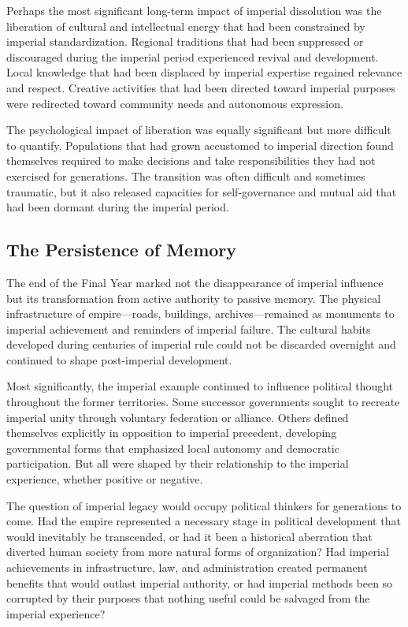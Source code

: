 Perhaps the most significant long-term impact of imperial dissolution
was the liberation of cultural and intellectual energy that had been
constrained by imperial standardization. Regional traditions that had
been suppressed or discouraged during the imperial period experienced
revival and development. Local knowledge that had been displaced by
imperial expertise regained relevance and respect. Creative activities
that had been directed toward imperial purposes were redirected toward
community needs and autonomous expression.

The psychological impact of liberation was equally significant but more
difficult to quantify. Populations that had grown accustomed to imperial
direction found themselves required to make decisions and take
responsibilities they had not exercised for generations. The transition
was often difficult and sometimes traumatic, but it also released
capacities for self-governance and mutual aid that had been dormant
during the imperial period.

\subsection{The Persistence of Memory}\label{the-persistence-of-memory}

The end of the Final Year marked not the disappearance of imperial
influence but its transformation from active authority to passive
memory. The physical infrastructure of empire---roads, buildings,
archives---remained as monuments to imperial achievement and reminders
of imperial failure. The cultural habits developed during centuries of
imperial rule could not be discarded overnight and continued to shape
post-imperial development.

Most significantly, the imperial example continued to influence
political thought throughout the former territories. Some successor
governments sought to recreate imperial unity through voluntary
federation or alliance. Others defined themselves explicitly in
opposition to imperial precedent, developing governmental forms that
emphasized local autonomy and democratic participation. But all were
shaped by their relationship to the imperial experience, whether
positive or negative.

The question of imperial legacy would occupy political thinkers for
generations to come. Had the empire represented a necessary stage in
political development that would inevitably be transcended, or had it
been a historical aberration that diverted human society from more
natural forms of organization? Had imperial achievements in
infrastructure, law, and administration created permanent benefits that
would outlast imperial authority, or had imperial methods been so
corrupted by their purposes that nothing useful could be salvaged from
the imperial experience?

